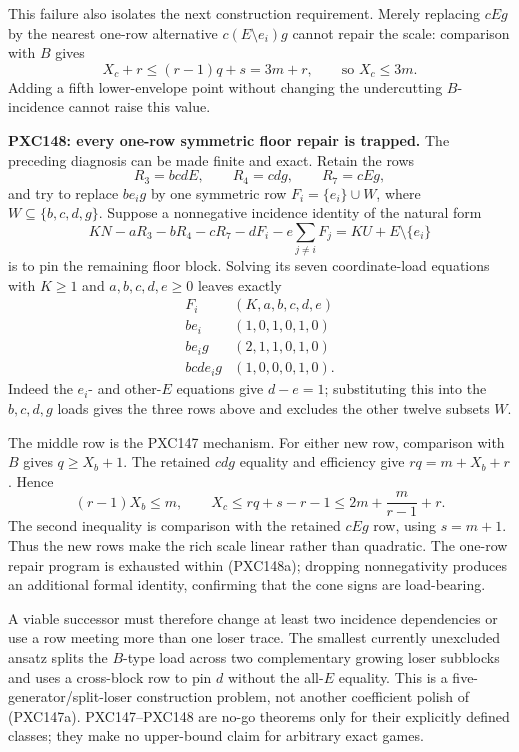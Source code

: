 \documentclass[11pt]{article}
\begin{document}
This failure also isolates the next construction requirement.  Merely
replacing \(cEg\) by the nearest one-row alternative
\(c(E\setminus e_i)g\) cannot repair the scale: comparison with \(B\) gives
\[
 X_c+r\le(r-1)q+s=3m+r,\qquad\text{so }X_c\le3m.          \tag{PXC147h}
\]
Adding a fifth lower-envelope point without changing the undercutting
\(B\)-incidence cannot raise this value.

\medskip
\noindent\textbf{PXC148: every one-row symmetric floor repair is trapped.}
The preceding diagnosis can be made finite and exact.  Retain the rows
\[
 R_3=bcdE,\qquad R_4=cdg,\qquad R_7=cEg,
\]
and try to replace \(be_i g\) by one symmetric row
\(F_i=\{e_i\}\cup W\), where \(W\subseteq\{b,c,d,g\}\).  Suppose a
nonnegative incidence identity of the natural form
\begin{equation}
 K N-aR_3-bR_4-cR_7-dF_i
   -e\sum_{j\ne i}F_j
   =K U+E\setminus\{e_i\}                              \tag{PXC148a}
\end{equation}
is to pin the remaining floor block.  Solving its seven coordinate-load
equations with \(K\ge1\) and \(a,b,c,d,e\ge0\) leaves exactly
\[
\begin{array}{c|c}
F_i&(K,a,b,c,d,e)\\ \hline
be_i&(1,0,1,0,1,0)\\
be_i g&(2,1,1,0,1,0)\\
bcde_i g&(1,0,0,0,1,0).
\end{array}                                             \tag{PXC148b}
\]
Indeed the \(e_i\)- and other-\(E\) equations give \(d-e=1\); substituting
this into the \(b,c,d,g\) loads gives the three rows above and excludes the
other twelve subsets \(W\).

The middle row is the PXC147 mechanism.  For either new row, comparison
with \(B\) gives \(q\ge X_b+1\).  The retained \(cdg\) equality and
efficiency give \(rq=m+X_b+r\).  Hence
\[
 (r-1)X_b\le m,\qquad
 X_c\le rq+s-r-1\le2m+\frac{m}{r-1}+r.                \tag{PXC148c}
\]
The second inequality is comparison with the retained \(cEg\) row, using
\(s=m+1\).  Thus the new rows make the rich scale linear rather than
quadratic.  The
one-row repair program is exhausted within (PXC148a); dropping
nonnegativity produces an additional formal identity, confirming that the
cone signs are load-bearing.

A viable successor must therefore change at least two incidence
dependencies or use a row meeting more than one loser trace.  The smallest
currently unexcluded ansatz splits the \(B\)-type load across two
complementary growing loser subblocks and uses a cross-block row to pin
\(d\) without the all-\(E\) equality.  This is a
five-generator/split-loser construction problem, not another coefficient
polish of (PXC147a).  PXC147--PXC148 are no-go theorems only for their
explicitly defined classes; they make no upper-bound claim for arbitrary
exact games.
\end{document}
